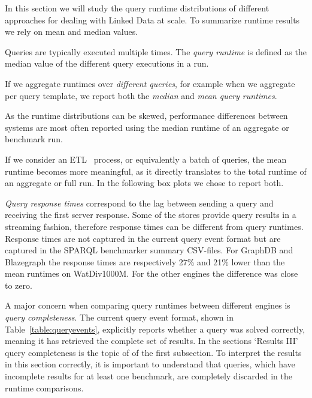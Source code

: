 In this section we will study the query runtime distributions of different approaches for dealing with Linked Data at scale. To summarize runtime results we rely on mean and median values. 

Queries are typically executed multiple times. The \emph{query runtime} is defined as the median value of the different query executions in a run. 

If we aggregate runtimes over \emph{different queries}, for example when we aggregate per query template, we report both the \emph{median} and \emph{mean query runtimes}. 

As the runtime distributions can be skewed, performance differences between systems are most often reported using the median runtime of an aggregate or benchmark run. 

If we consider an ETL~\cite{ETL} process, or equivalently a batch of queries, the mean runtime becomes more meaningful, as it directly translates to the total runtime of an aggregate or full run. In the following box plots we chose to report both.

\emph{Query response times} correspond to the lag between sending a query and receiving the first server response. 
Some of the stores provide query results in a streaming fashion, 
therefore response times can be different from query runtimes.
Response times are not captured in the current query event format but are captured in the SPARQL benchmarker summary CSV-files. For GraphDB and Blazegraph the response times are respectively 27\% and 21\% lower than the mean runtimes on WatDiv1000M. For the other engines the difference was close to zero.

A major concern when comparing query runtimes between different engines is \emph{query completeness}. The current query event format, shown in Table~\ref{table:queryevents}, explicitly reports whether a query was solved correctly, meaning it has retrieved the complete set of results. In the sections `Results III' query completeness is the topic of of the first subsection.
To interpret the results in this section correctly, it is important to understand that queries, which have incomplete results for at least one benchmark, are completely discarded in the runtime comparisons.

